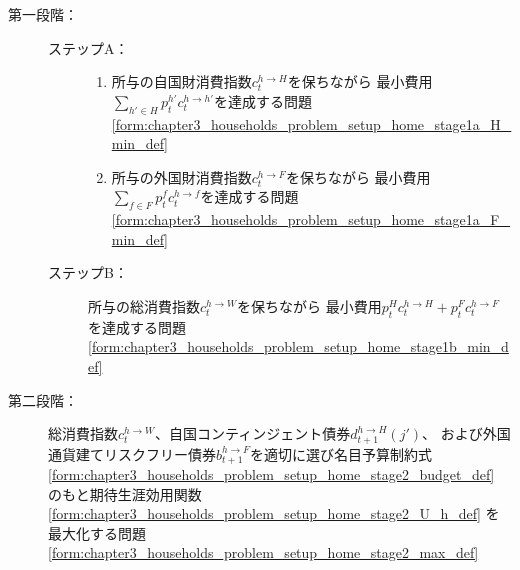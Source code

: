 \begin{description}
    \item[第一段階：]
    \label{itm:chapter3_households_problem_setup_home_two_stage_stage1}
        \begin{description}
            \item[ステップA：]
            \label{itm:chapter3_households_problem_setup_home_two_stage_stage1a}
                \begin{enumerate}
                    \item
                    \label{itm:chapter3_households_problem_setup_home_two_stage_stage1a_H}
                        所与の自国財消費指数\(c_t^{h\to H}\)を保ちながら
                        最小費用\(\sum_{h'\in H}p_t^{h'}c_t^{h\to h'}\)を達成する問題
                        \eqref{form:chapter3_households_problem_setup_home_stage1a_H_min_def}
                    \item
                    \label{itm:chapter3_households_problem_setup_home_two_stage_stage1a_F}
                        所与の外国財消費指数\(c_t^{h\to F}\)を保ちながら
                        最小費用\(\sum_{f\in F}p_t^{f}c_t^{h\to f}\)を達成する問題
                        \eqref{form:chapter3_households_problem_setup_home_stage1a_F_min_def}
                \end{enumerate}
            \item[ステップB：]
            \label{itm:chapter3_households_problem_setup_home_two_stage_stage1b}
                所与の総消費指数\(c_t^{h\to W}\)を保ちながら
                最小費用\(p_t^Hc_t^{h\to H}+p_t^Fc_t^{h\to F}\)を達成する問題
                \eqref{form:chapter3_households_problem_setup_home_stage1b_min_def}
        \end{description}
    \item[第二段階：]
    \label{itm:chapter3_households_problem_setup_home_two_stage_stage2}
        総消費指数\(c_t^{h\to W}\)、自国コンティンジェント債券\(d_{t+1}^{h\to H}(j')\)、
        および外国通貨建てリスクフリー債券\(b_{t+1}^{h\to F}\)を適切に選び名目予算制約式
        \eqref{form:chapter3_households_problem_setup_home_stage2_budget_def}
        のもと期待生涯効用関数
        \eqref{form:chapter3_households_problem_setup_home_stage2_U_h_def}
        を最大化する問題
        \eqref{form:chapter3_households_problem_setup_home_stage2_max_def}
\end{description}


